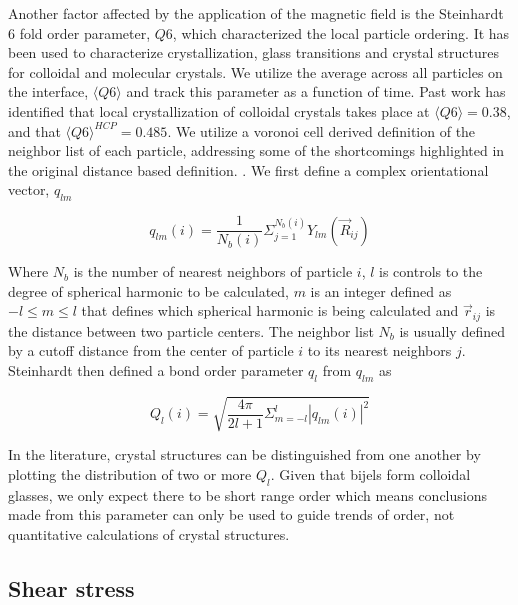 Another factor affected by the application of the magnetic field is the Steinhardt 6 fold order parameter, $Q6$, which characterized the local 
particle ordering. \cite{steinhardt_bond-orientational_1983} It has been used to characterize crystallization, glass transitions and crystal 
structures for colloidal and molecular crystals. We utilize the average across all particles on the interface, $\langle Q6 \rangle$ and track 
this parameter as a function of time. Past work has identified that local crystallization of colloidal crystals takes place at $\langle Q6 \rangle = 0.38$, 
and that $\langle Q6 \rangle^{HCP} = 0.485$. \cite{steinhardt_bond-orientational_1983, toxvaerd_role_2020, mickel_shortcomings_2013} We utilize a voronoi 
cell derived definition of the neighbor list of each particle, addressing some of the shortcomings highlighted in the original distance based definition. 
\cite{steinhardt_bond-orientational_1983, mickel_shortcomings_2013}. We first define a complex orientational vector, $q_{lm}$

\begin{equation}
q_{lm}(i) = \frac{1}{N_b(i)} \Sigma_{j = 1}^{N_b(i)} Y_{lm}(\vec{R}_{ij})
\end{equation}

Where $N_b$ is the number of nearest neighbors of particle $i$, $l$ is controls to the degree of spherical harmonic to be calculated, $m$ is an integer 
defined as $-l \leq m \leq l$ that defines which spherical harmonic is being calculated and $\vec{r}_{ij}$ is the distance between two particle centers. 
The neighbor list $N_b$ is usually defined by a cutoff distance from the center of particle $i$ to its nearest neighbors $j$. Steinhardt then defined a 
bond order parameter $q_l$ from $q_{lm}$ as

\begin{equation}
Q_{l}(i) = \sqrt{\frac{4 \pi}{2l + 1} \Sigma_{m = -l}^{l} |q_{lm}(i)|^2}
\end{equation}

In the literature, crystal structures can be distinguished from one another by plotting the distribution of two or more $Q_{l}$. 
\cite{lechner_accurate_2008, mickel_shortcomings_2013} Given that bijels form colloidal glasses, we only expect there to be
short range order which means conclusions made from this parameter can only be used to guide trends of order, not quantitative 
calculations of crystal structures.


\subsection{Shear stress}
\label{section:shear_viscosity}

